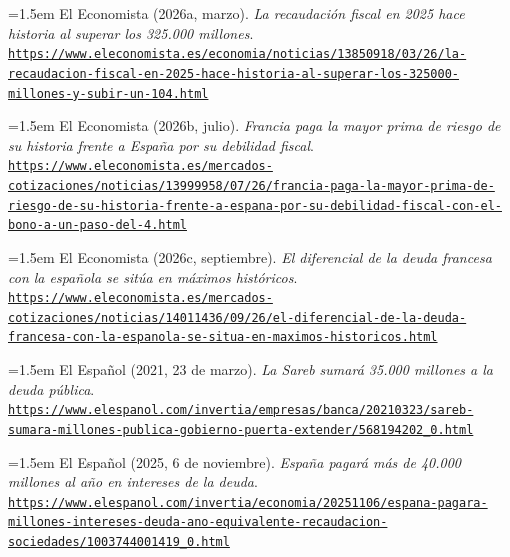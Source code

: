 \documentclass[10pt,a4paper]{article}
\begin{document}
\noindent\hangindent=1.5em El Economista (2026a, marzo). \textit{La recaudación fiscal en 2025 hace historia al superar los 325.000 millones}. \href{https://www.eleconomista.es/economia/noticias/13850918/03/26/la-recaudacion-fiscal-en-2025-hace-historia-al-superar-los-325000-millones-y-subir-un-104.html}{\nolinkurl{https://www.eleconomista.es/economia/noticias/13850918/03/26/la-recaudacion-fiscal-en-2025-hace-historia-al-superar-los-325000-millones-y-subir-un-104.html}}

\noindent\hangindent=1.5em El Economista (2026b, julio). \textit{Francia paga la mayor prima de riesgo de su historia frente a España por su debilidad fiscal}. \href{https://www.eleconomista.es/mercados-cotizaciones/noticias/13999958/07/26/francia-paga-la-mayor-prima-de-riesgo-de-su-historia-frente-a-espana-por-su-debilidad-fiscal-con-el-bono-a-un-paso-del-4.html}{\nolinkurl{https://www.eleconomista.es/mercados-cotizaciones/noticias/13999958/07/26/francia-paga-la-mayor-prima-de-riesgo-de-su-historia-frente-a-espana-por-su-debilidad-fiscal-con-el-bono-a-un-paso-del-4.html}}

\noindent\hangindent=1.5em El Economista (2026c, septiembre). \textit{El diferencial de la deuda francesa con la española se sitúa en máximos históricos}. \href{https://www.eleconomista.es/mercados-cotizaciones/noticias/14011436/09/26/el-diferencial-de-la-deuda-francesa-con-la-espanola-se-situa-en-maximos-historicos.html}{\nolinkurl{https://www.eleconomista.es/mercados-cotizaciones/noticias/14011436/09/26/el-diferencial-de-la-deuda-francesa-con-la-espanola-se-situa-en-maximos-historicos.html}}

\noindent\hangindent=1.5em El Español (2021, 23 de marzo). \textit{La Sareb sumará 35.000 millones a la deuda pública}. \href{https://www.elespanol.com/invertia/empresas/banca/20210323/sareb-sumara-millones-publica-gobierno-puerta-extender/568194202_0.html}{\nolinkurl{https://www.elespanol.com/invertia/empresas/banca/20210323/sareb-sumara-millones-publica-gobierno-puerta-extender/568194202_0.html}}

\noindent\hangindent=1.5em El Español (2025, 6 de noviembre). \textit{España pagará más de 40.000 millones al año en intereses de la deuda}. \href{https://www.elespanol.com/invertia/economia/20251106/espana-pagara-millones-intereses-deuda-ano-equivalente-recaudacion-sociedades/1003744001419_0.html}{\nolinkurl{https://www.elespanol.com/invertia/economia/20251106/espana-pagara-millones-intereses-deuda-ano-equivalente-recaudacion-sociedades/1003744001419_0.html}}
\end{document}
